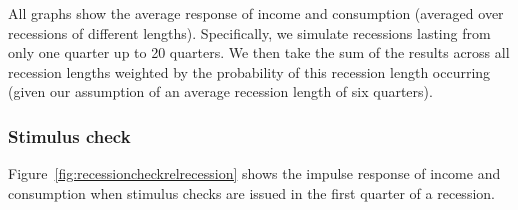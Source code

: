\documentclass[qe]{econsocart}
\begin{document}
All graphs show the average response of income and consumption (averaged over recessions of different lengths).
Specifically, we simulate recessions lasting from only one quarter up to 20 quarters.
We then take the sum of the results across all recession lengths weighted by the probability of this recession length occurring (given our assumption of an average recession length of six quarters).

\subsubsection{Stimulus check}

Figure~\ref{fig:recessioncheckrelrecession} shows the impulse response of income and consumption when stimulus checks are issued in the first quarter of a recession.

\vspace{1em}
\FloatBarrier %
\end{document}
